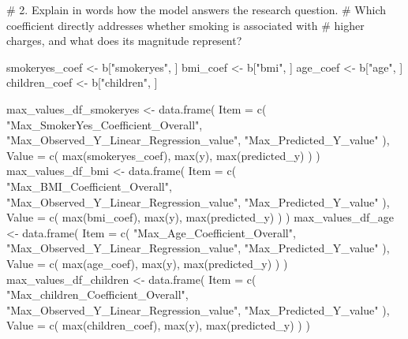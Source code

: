 \documentclass[
  letterpaper,
  DIV=11,
  numbers=noendperiod]{scrreprt}
\newenvironment{Shaded}{\begin{snugshade}}{\end{snugshade}}
\newcommand{\AttributeTok}[1]{\textcolor[rgb]{0.40,0.45,0.13}{#1}}
\newcommand{\CommentTok}[1]{\textcolor[rgb]{0.37,0.37,0.37}{#1}}
\newcommand{\FunctionTok}[1]{\textcolor[rgb]{0.28,0.35,0.67}{#1}}
\newcommand{\NormalTok}[1]{\textcolor[rgb]{0.00,0.23,0.31}{#1}}
\newcommand{\OtherTok}[1]{\textcolor[rgb]{0.00,0.23,0.31}{#1}}
\newcommand{\StringTok}[1]{\textcolor[rgb]{0.13,0.47,0.30}{#1}}
\begin{document}
{\begin{Shaded}
\begin{Highlighting}[]
\CommentTok{\# 2. Explain in words how the model answers the research question.}
\CommentTok{\# Which coefficient directly addresses whether smoking is associated with }
\CommentTok{\# higher charges, and what does its magnitude represent?}

\NormalTok{smokeryes\_coef }\OtherTok{\textless{}{-}}\NormalTok{ b[}\StringTok{"smokeryes"}\NormalTok{, ]}
\NormalTok{bmi\_coef }\OtherTok{\textless{}{-}}\NormalTok{ b[}\StringTok{"bmi"}\NormalTok{, ]}
\NormalTok{age\_coef }\OtherTok{\textless{}{-}}\NormalTok{ b[}\StringTok{"age"}\NormalTok{, ]}
\NormalTok{children\_coef }\OtherTok{\textless{}{-}}\NormalTok{ b[}\StringTok{"children"}\NormalTok{, ]}

\NormalTok{max\_values\_df\_smokeryes }\OtherTok{\textless{}{-}} \FunctionTok{data.frame}\NormalTok{(}
  \AttributeTok{Item =} \FunctionTok{c}\NormalTok{(}
    \StringTok{"Max\_SmokerYes\_Coefficient\_Overall"}\NormalTok{,}
    \StringTok{"Max\_Observed\_Y\_Linear\_Regression\_value"}\NormalTok{,}
    \StringTok{"Max\_Predicted\_Y\_value"}
\NormalTok{  ),}
  \AttributeTok{Value =} \FunctionTok{c}\NormalTok{(}
    \FunctionTok{max}\NormalTok{(smokeryes\_coef),}
    \FunctionTok{max}\NormalTok{(y),}
    \FunctionTok{max}\NormalTok{(predicted\_y)}
\NormalTok{  )}
\NormalTok{)}
\NormalTok{max\_values\_df\_bmi }\OtherTok{\textless{}{-}} \FunctionTok{data.frame}\NormalTok{(}
  \AttributeTok{Item =} \FunctionTok{c}\NormalTok{(}
    \StringTok{"Max\_BMI\_Coefficient\_Overall"}\NormalTok{,}
    \StringTok{"Max\_Observed\_Y\_Linear\_Regression\_value"}\NormalTok{,}
    \StringTok{"Max\_Predicted\_Y\_value"}
\NormalTok{  ),}
  \AttributeTok{Value =} \FunctionTok{c}\NormalTok{(}
    \FunctionTok{max}\NormalTok{(bmi\_coef),}
    \FunctionTok{max}\NormalTok{(y),}
    \FunctionTok{max}\NormalTok{(predicted\_y)}
\NormalTok{  )}
\NormalTok{)}
\NormalTok{max\_values\_df\_age }\OtherTok{\textless{}{-}} \FunctionTok{data.frame}\NormalTok{(}
  \AttributeTok{Item =} \FunctionTok{c}\NormalTok{(}
    \StringTok{"Max\_Age\_Coefficient\_Overall"}\NormalTok{,}
    \StringTok{"Max\_Observed\_Y\_Linear\_Regression\_value"}\NormalTok{,}
    \StringTok{"Max\_Predicted\_Y\_value"}
\NormalTok{  ),}
  \AttributeTok{Value =} \FunctionTok{c}\NormalTok{(}
    \FunctionTok{max}\NormalTok{(age\_coef),}
    \FunctionTok{max}\NormalTok{(y),}
    \FunctionTok{max}\NormalTok{(predicted\_y)}
\NormalTok{  )}
\NormalTok{)}
\NormalTok{max\_values\_df\_children }\OtherTok{\textless{}{-}} \FunctionTok{data.frame}\NormalTok{(}
  \AttributeTok{Item =} \FunctionTok{c}\NormalTok{(}
    \StringTok{"Max\_children\_Coefficient\_Overall"}\NormalTok{,}
    \StringTok{"Max\_Observed\_Y\_Linear\_Regression\_value"}\NormalTok{,}
    \StringTok{"Max\_Predicted\_Y\_value"}
\NormalTok{  ),}
  \AttributeTok{Value =} \FunctionTok{c}\NormalTok{(}
    \FunctionTok{max}\NormalTok{(children\_coef),}
    \FunctionTok{max}\NormalTok{(y),}
    \FunctionTok{max}\NormalTok{(predicted\_y)}
\NormalTok{  )}
\NormalTok{)}


\end{Highlighting}
\end{Shaded}}
\end{document}
